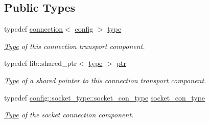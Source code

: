 \subsection*{Public Types}
\begin{DoxyCompactItemize}
\item 
\mbox{\label{classwebsocketpp_1_1transport_1_1asio_1_1connection_a8d3c48e550b2570f65cf84de034068c8}} 
typedef \mbox{\hyperlink{classwebsocketpp_1_1transport_1_1asio_1_1connection}{connection}}$<$ \mbox{\hyperlink{classconfig}{config}} $>$ \mbox{\hyperlink{classwebsocketpp_1_1transport_1_1asio_1_1connection_a8d3c48e550b2570f65cf84de034068c8}{type}}
\begin{DoxyCompactList}\small\item\em \mbox{\hyperlink{struct_type}{Type}} of this connection transport component. \end{DoxyCompactList}\item 
\mbox{\label{classwebsocketpp_1_1transport_1_1asio_1_1connection_aa6f25556860a154c4dacb4dac1dce8e4}} 
typedef lib\+::shared\+\_\+ptr$<$ \mbox{\hyperlink{classwebsocketpp_1_1transport_1_1asio_1_1connection_a8d3c48e550b2570f65cf84de034068c8}{type}} $>$ \mbox{\hyperlink{classwebsocketpp_1_1transport_1_1asio_1_1connection_aa6f25556860a154c4dacb4dac1dce8e4}{ptr}}
\begin{DoxyCompactList}\small\item\em \mbox{\hyperlink{struct_type}{Type}} of a shared pointer to this connection transport component. \end{DoxyCompactList}\item 
\mbox{\label{classwebsocketpp_1_1transport_1_1asio_1_1connection_a85712056cec173324f790a92a0d94021}} 
typedef \mbox{\hyperlink{classwebsocketpp_1_1transport_1_1asio_1_1tls__socket_1_1endpoint_a690393b3da13e389cf025f88a3d38f3f}{config\+::socket\+\_\+type\+::socket\+\_\+con\+\_\+type}} \mbox{\hyperlink{classwebsocketpp_1_1transport_1_1asio_1_1connection_a85712056cec173324f790a92a0d94021}{socket\+\_\+con\+\_\+type}}
\begin{DoxyCompactList}\small\item\em \mbox{\hyperlink{struct_type}{Type}} of the socket connection component. \end{DoxyCompactList}\item 

\end{DoxyCompactItemize}
